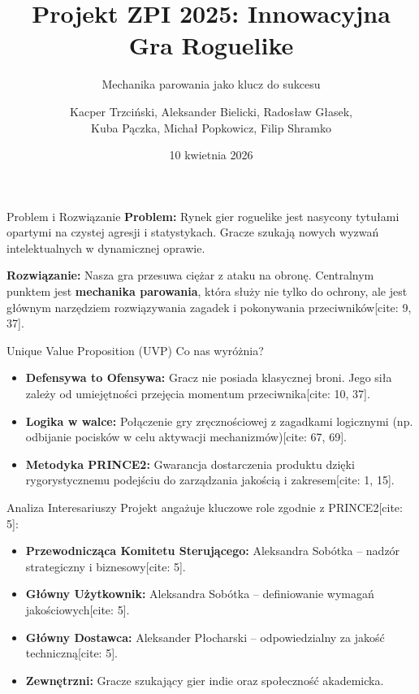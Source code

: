\documentclass[10pt]{beamer}
\title{Projekt ZPI 2025: Innowacyjna Gra Roguelike}
\subtitle{Mechanika parowania jako klucz do sukcesu}
\date{10 kwietnia 2026}
\author{Kacper Trzciński, Aleksander Bielicki, Radosław Głasek, \\ Kuba Pączka, Michał Popkowicz, Filip Shramko}
\institute{Zarządzanie Przedsięwzięciami Informatycznymi}
\begin{document}
\maketitle

\begin{frame}{Problem i Rozwiązanie}
    \textbf{Problem:} Rynek gier roguelike jest nasycony tytułami opartymi na czystej agresji i statystykach. Gracze szukają nowych wyzwań intelektualnych w dynamicznej oprawie. \par
    \vspace{0.5cm}
    \textbf{Rozwiązanie:} Nasza gra przesuwa ciężar z ataku na obronę. Centralnym punktem jest \textbf{mechanika parowania}, która służy nie tylko do ochrony, ale jest głównym narzędziem rozwiązywania zagadek i pokonywania przeciwników[cite: 9, 37].
\end{frame}

\begin{frame}{Unique Value Proposition (UVP)}
    Co nas wyróżnia?
    \begin{itemize}
        \item \textbf{Defensywa to Ofensywa:} Gracz nie posiada klasycznej broni. Jego siła zależy od umiejętności przejęcia momentum przeciwnika[cite: 10, 37].
        \item \textbf{Logika w walce:} Połączenie gry zręcznościowej z zagadkami logicznymi (np. odbijanie pocisków w celu aktywacji mechanizmów)[cite: 67, 69].
        \item \textbf{Metodyka PRINCE2:} Gwarancja dostarczenia produktu dzięki rygorystycznemu podejściu do zarządzania jakością i zakresem[cite: 1, 15].
    \end{itemize}
\end{frame}

\begin{frame}{Analiza Interesariuszy}
    Projekt angażuje kluczowe role zgodnie z PRINCE2[cite: 5]:
    \begin{itemize}
        \item \textbf{Przewodnicząca Komitetu Sterującego:} Aleksandra Sobótka – nadzór strategiczny i biznesowy[cite: 5].
        \item \textbf{Główny Użytkownik:} Aleksandra Sobótka – definiowanie wymagań jakościowych[cite: 5].
        \item \textbf{Główny Dostawca:} Aleksander Płocharski – odpowiedzialny za jakość techniczną[cite: 5].
        \item \textbf{Zewnętrzni:} Gracze szukający gier indie oraz społeczność akademicka.
    \end{itemize}
\end{frame}
\end{document}
